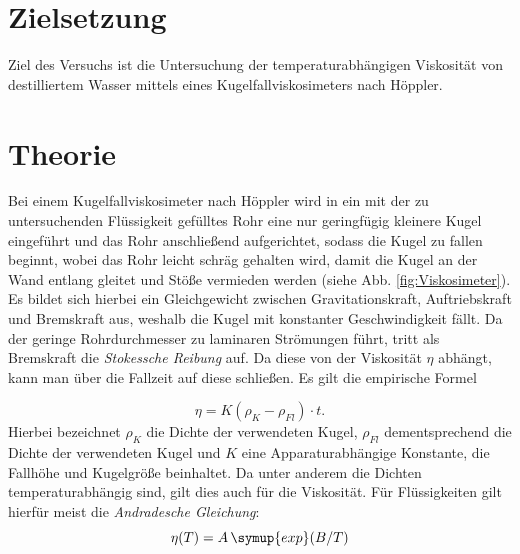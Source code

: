 \section{Zielsetzung}
\label{sec:Ziel}
Ziel des Versuchs ist die Untersuchung der temperaturabhängigen Viskosität von destilliertem Wasser mittels eines Kugelfallviskosimeters nach Höppler.


\section{Theorie}
\label{sec:Theorie}
Bei einem Kugelfallviskosimeter nach Höppler wird in ein mit der zu untersuchenden Flüssigkeit gefülltes Rohr eine nur geringfügig kleinere Kugel eingeführt und das Rohr anschließend aufgerichtet, sodass die Kugel zu fallen beginnt, wobei das Rohr leicht schräg gehalten wird, damit die Kugel an der Wand entlang gleitet und Stöße vermieden werden (siehe Abb. \ref{fig:Viskosimeter}). Es bildet sich hierbei ein Gleichgewicht zwischen Gravitationskraft, Auftriebskraft und Bremskraft aus, weshalb die Kugel mit konstanter Geschwindigkeit fällt. Da der geringe Rohrdurchmesser zu laminaren Strömungen führt, tritt als Bremskraft die \textit{Stokessche Reibung} auf. Da diese von der Viskosität $\eta$ abhängt, kann man über die Fallzeit auf diese schließen.
Es gilt die empirische Formel

\begin{equation}
  \eta = K \left(\rho_K - \rho_{Fl}\right) \cdot t.
  \label{eqn:eta}
\end{equation}
Hierbei bezeichnet $\rho_K$ die Dichte der verwendeten Kugel, $\rho_{Fl}$ dementsprechend die Dichte der verwendeten Kugel und $K$ eine Apparaturabhängige Konstante, die Fallhöhe und Kugelgröße beinhaltet. Da unter anderem die Dichten temperaturabhängig sind, gilt dies auch für die Viskosität. Für Flüssigkeiten gilt hierfür meist die \textit{Andradesche Gleichung}:
\begin{equation}
  \eta(T) = A \, \symup{exp}(B/T)
  \label{eqn:eta(T)}
\end{equation}

